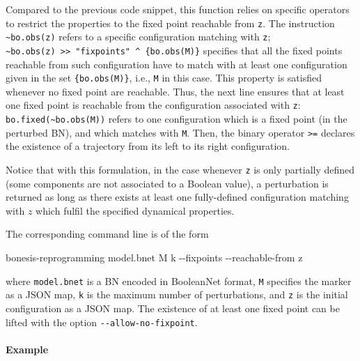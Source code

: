 \documentclass[PCJ,Unicode,screen,mode=plain]{cedram}
\newenvironment{Shaded}{}{}
\newcommand{\NormalTok}[1]{{#1}}
\newcommand{\ExtensionTok}[1]{{#1}}
\newcommand{\AttributeTok}[1]{\textcolor[rgb]{0.49,0.56,0.16}{{#1}}}
\begin{document}
Compared to the previous code snippet, this function relies on specific
operators to restrict the properties to the fixed point reachable from
\texttt{z}. The instruction \texttt{\textasciitilde{}bo.obs(z)} refers
to a specific configuration matching with \texttt{z};
\texttt{\textasciitilde{}bo.obs(z)\ \textgreater{}\textgreater{}\ "fixpoints"\ \^{}\ \{bo.obs(M)\}}
specifies that all the fixed points reachable from such configuration
have to match with at least one configuration given in the set
\texttt{\{bo.obs(M)\}}, i.e., \texttt{M} in this case. This property is
satisfied whenever no fixed point are reachable. Thus, the next line
ensures that at least one fixed point is reachable from the
configuration associated with \texttt{z}:
\texttt{bo.fixed(\textasciitilde{}bo.obs(M))} refers to one
configuration which is a fixed point (in the perturbed BN), and which
matches with \texttt{M}. Then, the binary operator
\texttt{\textgreater{}=} declares the existence of a trajectory from its
left to its right configuration.

Notice that with this formulation, in the case whenever \texttt{z} is
only partially defined (some components are not associated to a Boolean
value), a perturbation is returned as long as there exists at least one
fully-defined configuration matching with \(z\) which fulfil the
specified dynamical properties.

The corresponding command line is of the form

\begin{Shaded}
\begin{Highlighting}[]
\ExtensionTok{bonesis{-}reprogramming}\NormalTok{ model.bnet M k }\AttributeTok{{-}{-}fixpoints} \AttributeTok{{-}{-}reachable{-}from}\NormalTok{ z}
\end{Highlighting}
\end{Shaded}

where \texttt{model.bnet} is a BN encoded in BooleanNet format,
\texttt{M} specifies the marker as a JSON map, \texttt{k} is the maximum
number of perturbations, and \texttt{z} is the initial configuration as
a JSON map. The existence of at least one fixed point can be lifted with
the option \texttt{-\/-allow-no-fixpoint}.
\paragraph{Example}
\end{document}
